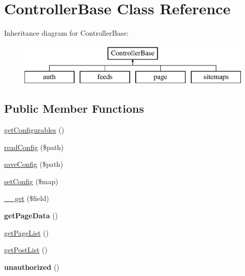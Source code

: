 \hypertarget{classControllerBase}{\section{Controller\-Base Class Reference}
\label{classControllerBase}
}
Inheritance diagram for Controller\-Base\-:\begin{figure}[H]
\begin{center}
\leavevmode
\includegraphics[height=2.000000cm]{classControllerBase}
\end{center}
\end{figure}
\subsection*{Public Member Functions}
\begin{DoxyCompactItemize}
\item 
\hyperlink{classControllerBase_adf22b33f94d79eadbae786f31fdb4b8b}{get\-Configurables} ()
\item 
\hyperlink{classControllerBase_a3de3699fd3f729abfc5fa59decef958f}{read\-Config} (\$path)
\item 
\hyperlink{classControllerBase_ae75dea3157d019d04c663481c60ff201}{save\-Config} (\$path)
\item 
\hyperlink{classControllerBase_afd930559882de5e0d77c5357e07f1af4}{set\-Config} (\$map)
\item 
\hyperlink{classControllerBase_add5cf51bbc1b21b6cea292aed3cb6b29}{\-\_\-\-\_\-get} (\$field)
\item 
\hypertarget{classControllerBase_ad017b0ed4dcdc83cdfa052ceb288366a}{{\bfseries get\-Page\-Data} ()}\label{classControllerBase_ad017b0ed4dcdc83cdfa052ceb288366a}

\item 
\hyperlink{classControllerBase_aae0d40bf6721d92c1a2285ba8edd5ebf}{get\-Page\-List} ()
\item 
\hyperlink{classControllerBase_a0cff8483987ef3926f543d46368a62bf}{get\-Post\-List} ()
\item 
\hypertarget{classControllerBase_a57c3f118de841efa789181fdb1398802}{{\bfseries unauthorized} ()}\label{classControllerBase_a57c3f118de841efa789181fdb1398802}

\end{DoxyCompactItemize}
